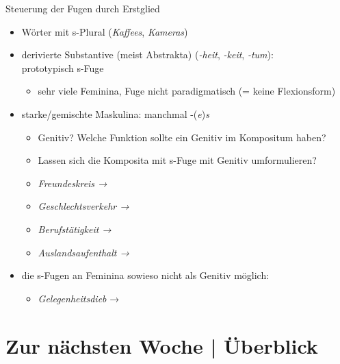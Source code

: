 \begin{frame}
  {Steuerung der Fugen durch Erstglied}
  \onslide<+->
  \begin{itemize}[<+->]
    \item Wörter mit s-Plural (\textit{Kaffees}, \textit{Kameras}) 
      \Halbzeile
    \item \alert{derivierte} Substantive (meist Abstrakta) (\textit{-heit}, \textit{-keit}, \textit{-tum}):\\
      \alert{prototypisch s-Fuge}
      \begin{itemize}[<+->]
        \item sehr viele Feminina, Fuge nicht paradigmatisch (= keine Flexionsform)
      \end{itemize}
      \Halbzeile
    \item starke\slash gemischte Maskulina: manchmal -(\textit{e})\textit{s}
      \begin{itemize}[<+->]
        \item Genitiv? Welche Funktion sollte ein Genitiv im Kompositum haben?
        \item Lassen sich die Komposita mit s-Fuge mit Genitiv umformulieren?
        \item \textit{Freundeskreis → }
        \item \textit{Geschlechtsverkehr → }
        \item \textit{Berufstätigkeit → }
        \item \textit{Auslandsaufenthalt → }
      \end{itemize}
    \Halbzeile
  \item die s-Fugen an \alert{Feminina} sowieso nicht als Genitiv möglich:
      \begin{itemize}
        \item \textit{Gelegenheitsdieb} → 
      \end{itemize}
  \end{itemize}
\end{frame}

\section{Zur nächsten Woche | Überblick}

